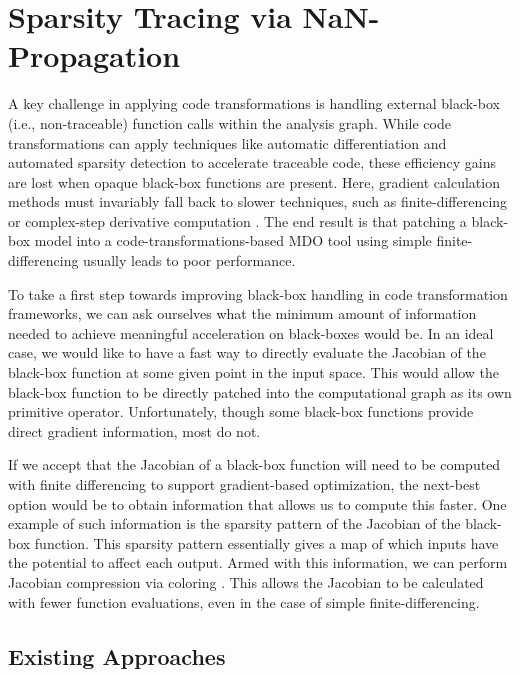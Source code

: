 \chapter{Sparsity Tracing via NaN-Propagation}
\label{chap:nan_propagation}

A key challenge in applying code transformations is handling external black-box (i.e., non-traceable) function calls within the analysis graph. While code transformations can apply techniques like automatic differentiation and automated sparsity detection to accelerate traceable code, these efficiency gains are lost when opaque black-box functions are present. Here, gradient calculation methods must invariably fall back to slower techniques, such as finite-differencing or complex-step derivative computation \cite{martins_complexstep_2003}. The end result is that patching a black-box model into a code-transformations-based MDO tool using simple finite-differencing usually leads to poor performance.

To take a first step towards improving black-box handling in code transformation frameworks, we can ask ourselves what the minimum amount of information needed to achieve meaningful acceleration on black-boxes would be. In an ideal case, we would like to have a fast way to directly evaluate the Jacobian of the black-box function at some given point in the input space. This would allow the black-box function to be directly patched into the computational graph as its own primitive operator. Unfortunately, though some black-box functions provide direct gradient information, most do not.

If we accept that the Jacobian of a black-box function will need to be computed with finite differencing to support gradient-based optimization, the next-best option would be to obtain information that allows us to compute this faster. One example of such information is the sparsity pattern of the Jacobian of the black-box function. This sparsity pattern essentially gives a map of which inputs have the potential to affect each output. Armed with this information, we can perform Jacobian compression via coloring \cite{gebremedhin_efficient_2009, gebremedhin_what_2005, martins_engineering_2021}. This allows the Jacobian to be calculated with fewer function evaluations, even in the case of simple finite-differencing.


\section{Existing Approaches}
\label{sec:nan-existing-methods}

